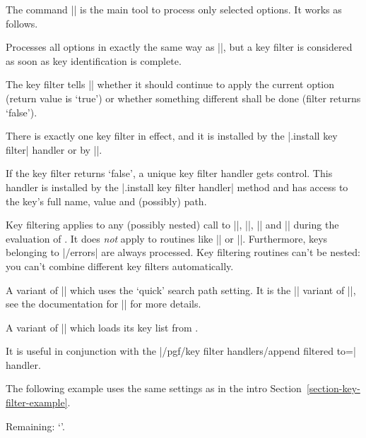 The command |\pgfkeysfiltered| is the main tool to process only selected
options. It works as follows.
%
\begin{command}{\pgfkeysfiltered{}}
    Processes all options in exactly the same way as
    |\pgfkeys|, but a key filter is considered as soon as
    key identification is complete.

    The key filter tells |\pgfkeysfiltered| whether it should continue to apply
    the current option (return value is `true') or whether something different
    shall be done (filter returns `false').

    There is exactly one key filter in effect, and it is installed by the
    |.install key filter| handler or by |\pgfkeysinstallkeyfilter|.

    If the key filter returns `false', a unique key filter handler gets
    control. This handler is installed by the |.install key filter handler|
    method and has access to the key's full name, value and (possibly) path.

    Key filtering applies to any (possibly nested) call to |\pgfkeys|,
    |\pgfkeysalso|, |\pgfqkeys| and |\pgfqkeysalso| during the evaluation of
    . It does \emph{not} apply to routines like
    |\pgfkeyssetvalue| or |\pgfkeysgetvalue|. Furthermore, keys belonging to
    |/errors| are always processed. Key filtering routines can't be nested: you
    can't combine different key filters automatically.
\end{command}

\begin{command}{\pgfqkeysfiltered{}}
    A variant of |\pgfkeysfiltered| which uses the `quick' search path setting.
    It is the |\pgfqkeys| variant of |\pgfkeysfiltered|, see the documentation
    for |\pgfqkeys| for more details.
\end{command}

\begin{command}{\pgfkeysalsofrom{}}
    A variant of |\pgfkeysalso| which loads its key list from .

    It is useful in conjunction with the
    |/pgf/key filter handlers/append filtered to=| handler.

    The following example uses the same settings as in the intro
    Section~\ref{section-key-filter-example}.
\begin{codeexample}[]
\def\remainingoptions{}

Remaining: `\remainingoptions'.
\pgfkeysalsofrom{\remainingoptions}
\end{codeexample}
\end{command}


